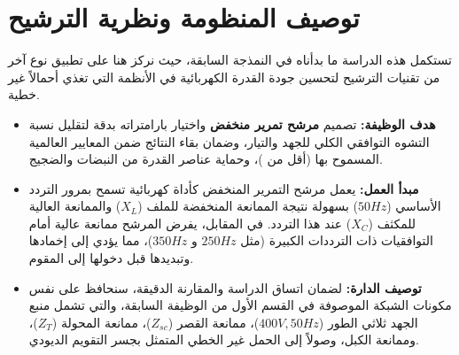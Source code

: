 
\section{توصيف المنظومة ونظرية الترشيح} \label{part2:sec1}

{\fontsize{16}{27}\selectfont
تستكمل هذه الدراسة ما بدأناه في النمذجة السابقة، حيث نركز هنا على تطبيق نوع آخر من تقنيات الترشيح لتحسين جودة القدرة الكهربائية في الأنظمة التي تغذي أحمالاً غير خطية.
\par}

\begin{itemize}
    \item \textbf{هدف الوظيفة:} تصميم \textbf{مرشح تمرير منخفض } واختيار بارامتراته بدقة لتقليل نسبة التشوه التوافقي الكلي  للجهد والتيار، وضمان بقاء النتائج ضمن المعايير العالمية المسموح بها (أقل من )، وحماية عناصر القدرة من النبضات والضجيج.
    
    \item \textbf{مبدأ العمل:} يعمل مرشح التمرير المنخفض كأداة كهربائية تسمح بمرور التردد الأساسي ($50 Hz$) بسهولة نتيجة الممانعة المنخفضة للملف ($X_L$) والممانعة العالية للمكثف ($X_C$) عند هذا التردد. في المقابل، يفرض المرشح ممانعة عالية أمام التوافقيات ذات الترددات الكبيرة (مثل $250 Hz$ و $350 Hz$)، مما يؤدي إلى إخمادها وتبديدها قبل دخولها إلى المقوم.
    
    \item \textbf{توصيف الدارة:} لضمان اتساق الدراسة والمقارنة الدقيقة، سنحافظ على نفس مكونات الشبكة الموصوفة في القسم الأول من الوظيفة السابقة، والتي تشمل منبع الجهد ثلاثي الطور ($400 V, 50 Hz$)، ممانعة القصر ($Z_{sc}$)، ممانعة المحولة ($Z_T$)، وممانعة الكبل، وصولاً إلى الحمل غير الخطي المتمثل بجسر التقويم الديودي.
\end{itemize}
